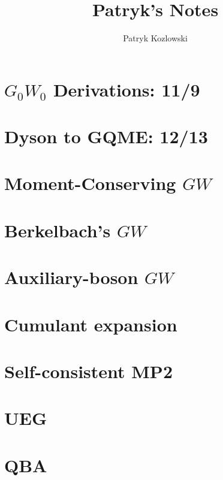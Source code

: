 \documentclass[12pt]{report}
\title{Patryk's Notes}
\author{Patryk Kozlowski}
\begin{document}
\setcounter{tocdepth}{3}  %
\tableofcontents
\clearpage  %

\maketitle

\chapter{$G_0W_0$ Derivations: 11/9}

\chapter{Dyson to GQME: 12/13}

% 
\chapter{Moment-Conserving $GW$}

\chapter{Berkelbach's $GW$}

\chapter{Auxiliary-boson $GW$}

\chapter{Cumulant expansion}

 
\chapter{Self-consistent MP2}

\chapter{UEG}

\chapter{QBA}

% 
% 
% 




% 


\end{document}
